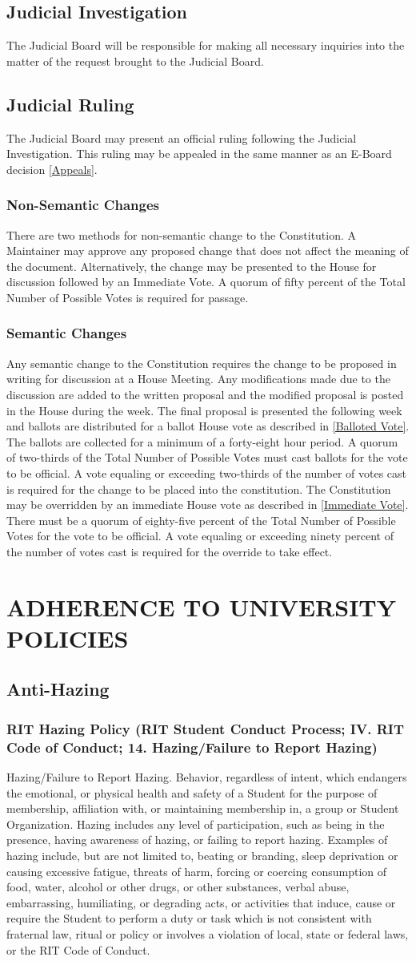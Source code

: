 \documentclass{article}
\newcommand{\article}[1]{\section{#1} \label{#1}}
\newcommand{\asection}[1]{\subsection{#1} \label{#1}}
\newcommand{\asubsection}[1]{\subsubsection{#1} \label{#1}}
\begin{document}
\asection{Judicial Investigation}
The Judicial Board will be responsible for making all necessary inquiries into the matter of the request brought to the Judicial Board.

\asection{Judicial Ruling}
The Judicial Board may present an official ruling following the Judicial Investigation.
This ruling may be appealed in the same manner as an E-Board decision \ref{Appeals}.

\asubsection{Non-Semantic Changes}
There are two methods for non-semantic change to the Constitution.
A Maintainer may approve any proposed change that does not affect the meaning of the document.
Alternatively, the change may be presented to the House for discussion followed by an Immediate Vote.
A quorum of fifty percent of the Total Number of Possible Votes is required for passage.

\asubsection{Semantic Changes}
Any semantic change to the Constitution requires the change to be proposed in writing for discussion at a House Meeting.
Any modifications made due to the discussion are added to the written proposal and the modified proposal is posted in the House during the week.
The final proposal is presented the following week and ballots are distributed for a ballot House vote as described in \ref{Balloted Vote}.
The ballots are collected for a minimum of a forty-eight hour period.
A quorum of two-thirds of the Total Number of Possible Votes must cast ballots for the vote to be official.
A vote equaling or exceeding two-thirds of the number of votes cast is required for the change to be placed into the constitution.
The Constitution may be overridden by an immediate House vote as described in \ref{Immediate Vote}.
There must be a quorum of eighty-five percent of the Total Number of Possible Votes for the vote to be official.
A vote equaling or exceeding ninety percent of the number of votes cast is required for the override to take effect.

\article{ADHERENCE TO UNIVERSITY POLICIES}

\asection{Anti-Hazing}

\asubsection{RIT Hazing Policy (RIT Student Conduct Process; IV. RIT Code of Conduct; 14. Hazing/Failure to Report
Hazing)}
Hazing/Failure to Report Hazing.
Behavior, regardless of intent, which endangers the emotional, or physical health and safety of a Student for the purpose of membership, affiliation with, or maintaining membership in, a group or Student Organization. Hazing includes any level of participation, such as being in the presence, having awareness of hazing, or failing to report hazing.
Examples of hazing include, but are not limited to, beating or branding, sleep deprivation or causing excessive fatigue, threats of harm, forcing or coercing consumption of food, water, alcohol or other drugs, or other substances, verbal abuse, embarrassing, humiliating, or degrading acts, or activities that induce, cause or require the Student to perform a duty or task which is not consistent with fraternal law, ritual or policy or involves a violation of local, state or federal laws, or the RIT Code of Conduct.
\end{document}

